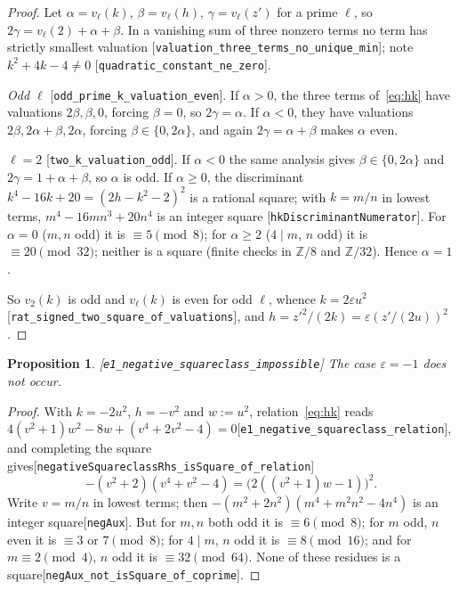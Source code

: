 \documentclass[10pt]{article}
\newtheorem{proposition}[theorem]{Proposition}
\theoremstyle{definition}
\theoremstyle{remark}
\newcommand{\Z}{\mathbb{Z}}
\newcommand{\leanref}[1]{{\scriptsize\textup{[\texttt{#1}]}}\allowbreak}
\begin{document}
\begin{proof}
Let $\alpha=v_\ell(k)$, $\beta=v_\ell(h)$, $\gamma=v_\ell(z')$ for a prime $\ell$,
so $2\gamma=v_\ell(2)+\alpha+\beta$.  In a vanishing sum of three nonzero
terms no term has strictly smallest valuation
\leanref{valuation\_\allowbreak three\_\allowbreak terms\_\allowbreak no\_\allowbreak unique\_\allowbreak min}; note $k^2+4k-4\ne0$
\leanref{quadratic\_\allowbreak constant\_\allowbreak ne\_\allowbreak zero}.

\emph{Odd $\ell$} \leanref{odd\_\allowbreak prime\_\allowbreak k\_\allowbreak valuation\_\allowbreak even}.  If $\alpha>0$, the
three terms of~\eqref{eq:hk} have valuations $2\beta,\beta,0$, forcing
$\beta=0$, so $2\gamma=\alpha$.  If $\alpha<0$, they have valuations
$2\beta,2\alpha+\beta,2\alpha$, forcing $\beta\in\{0,2\alpha\}$, and again
$2\gamma=\alpha+\beta$ makes $\alpha$ even.

\emph{$\ell=2$} \leanref{two\_\allowbreak k\_\allowbreak valuation\_\allowbreak odd}.  If $\alpha<0$ the same analysis
gives $\beta\in\{0,2\alpha\}$ and $2\gamma=1+\alpha+\beta$, so $\alpha$ is odd.
If $\alpha\ge0$, the discriminant $k^4-16k+20=(2h-k^2-2)^2$ is a rational
square; with $k=m/n$ in lowest terms, $m^4-16mn^3+20n^4$ is an integer square
\leanref{hk\allowbreak Discriminant\allowbreak Numerator}.  For $\alpha=0$ ($m,n$ odd) it is
$\equiv5\pmod8$; for $\alpha\ge2$ ($4\mid m$, $n$ odd) it is $\equiv20\pmod{32}$;
neither is a square (finite checks in $\Z/8$ and $\Z/32$).  Hence $\alpha=1$.

So $v_2(k)$ is odd and $v_\ell(k)$ is even for odd $\ell$, whence
$k=2\varepsilon u^2$\leanref{rat\_\allowbreak signed\_\allowbreak two\_\allowbreak square\_\allowbreak of\_\allowbreak valuations}, and
$h=z'^2/(2k)=\varepsilon(z'/(2u))^2$.
\end{proof}

\begin{proposition}\label{prop:negative}
\leanref{e1\_\allowbreak negative\_\allowbreak squareclass\_\allowbreak impossible}
The case $\varepsilon=-1$ does not occur.
\end{proposition}
\begin{proof}
With $k=-2u^2$, $h=-v^2$ and $w:=u^2$, relation~\eqref{eq:hk} reads
$4(v^2+1)w^2-8w+(v^4+2v^2-4)=0$\leanref{e1\_\allowbreak negative\_\allowbreak squareclass\_\allowbreak relation},
and completing the square gives\leanref{negative\allowbreak Squareclass\allowbreak Rhs\_\allowbreak is\allowbreak Square\_\allowbreak of\_\allowbreak relation}
\[
 -(v^2+2)(v^4+v^2-4)=\bigl(2((v^2+1)w-1)\bigr)^2 .
\]
Write $v=m/n$ in lowest terms; then
$-(m^2+2n^2)(m^4+m^2n^2-4n^4)$ is an integer square\leanref{neg\allowbreak Aux}.  But for
$m,n$ both odd it is $\equiv6\pmod8$; for $m$ odd, $n$ even it is $\equiv3$ or
$7\pmod8$; for $4\mid m$, $n$ odd it is $\equiv8\pmod{16}$; and for
$m\equiv2\pmod4$, $n$ odd it is $\equiv32\pmod{64}$.  None of these residues is
a square\leanref{neg\allowbreak Aux\_\allowbreak not\_\allowbreak is\allowbreak Square\_\allowbreak of\_\allowbreak coprime}.
\end{proof}
\end{document}

